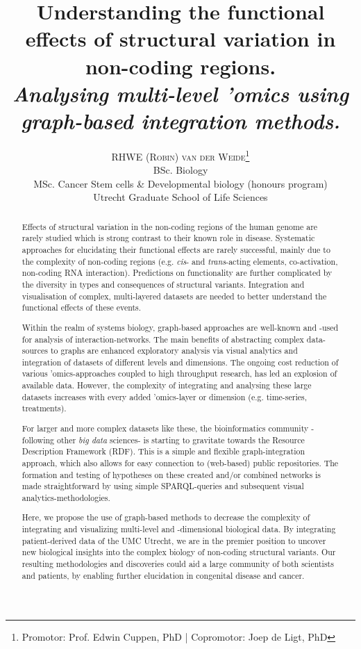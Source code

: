 \documentclass[twoside,fontsize=12pt]{article}
\title{\vspace{-15mm}\fontsize{18pt}{10pt}\normalfont\textbf{Understanding the functional effects of structural variation in non-coding regions.\\ \vspace{4 mm} {{\footnotesize \textit{Analysing multi-level 'omics using graph-based integration methods.}}}}} %
\author{
\large
\textsc {RHWE (Robin) van der Weide}\thanks{Promotor: Prof. Edwin Cuppen, PhD | Copromotor: Joep de Ligt, PhD}\\[2mm] 
\normalsize  BSc. Biology\\
\normalsize  MSc. Cancer Stem cells \& Developmental biology (honours program)\\
\normalsize  Utrecht Graduate School of Life Sciences \\
\vspace{-5mm}
}
\date{}
\renewcommand{\abstractname}{}    %
\begin{document}
\maketitle %

\thispagestyle{fancy} %

\newpage
\renewcommand{\abstractname}{\begin{center}
Summary of the research
\end{center}}    %

\begin{abstract}
\noindent
Effects of structural variation in the non-coding regions of the human genome are rarely studied which is strong contrast to their known role in disease\cite{Weischenfeldt2013}. Systematic approaches for elucidating their functional effects are rarely successful, mainly due to the complexity of non-coding regions (e.g. \textit{cis}- and \textit{trans}-acting elements, co-activation, non-coding RNA interaction). Predictions on functionality are further complicated by the diversity in types and consequences of structural variants. Integration and visualisation of complex, multi-layered datasets are needed to better understand the functional effects of these events\cite{Munoz2011}.
\medskip

\noindent 
Within the realm of systems biology, graph-based approaches are well-known and -used for analysis of interaction-networks. The main benefits of abstracting complex data-sources to graphs are enhanced exploratory analysis via visual analytics and integration of datasets of different levels and dimensions. The ongoing cost reduction of various 'omics-approaches coupled to high throughput research, has led an explosion of available data. However, the complexity of integrating and analysing these large datasets increases with every added 'omics-layer or dimension (e.g. time-series, treatments). 

For larger and more complex datasets like these, the bioinformatics community -following other \textit{big data} sciences- is starting to gravitate towards the Resource Description Framework (RDF). This is a simple and flexible graph-integration approach, which also allows for easy connection to (web-based) public repositories. The formation and testing of hypotheses on these created and/or combined networks is made straightforward by using simple SPARQL-queries and subsequent visual analytics-methodologies.
\medskip

\noindent Here, we propose the use of graph-based methods to decrease the complexity of integrating and visualizing multi-level and -dimensional biological data. By integrating patient-derived data of the UMC Utrecht, we are in the premier position to uncover new biological insights into the complex biology of non-coding structural variants. Our resulting methodologies and discoveries could aid a large community of both scientists and patients, by enabling further elucidation in congenital disease and cancer. 
\end{abstract}
\medskip
\end{document}
